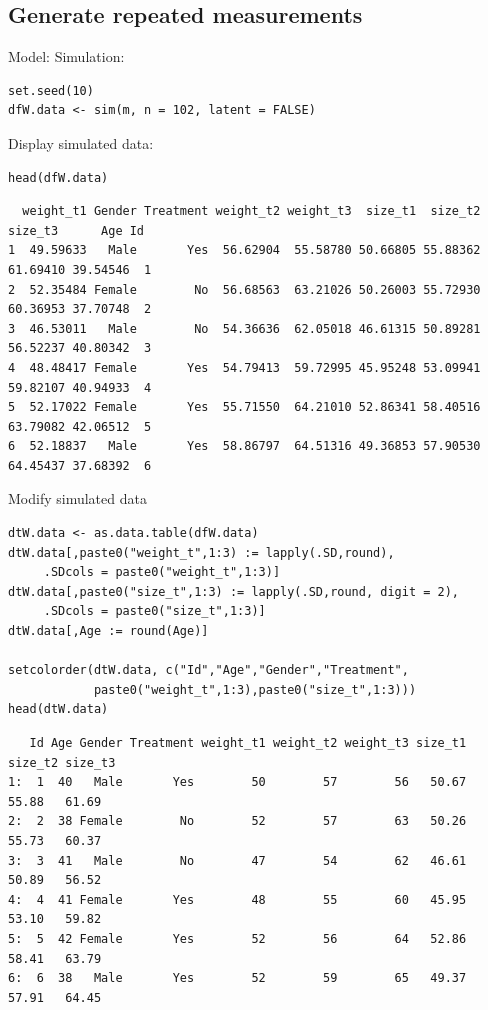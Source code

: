 \documentclass{article}
\begin{document}
\subsection{Generate repeated measurements}
\label{sec:orgcde3189}
Model:
Simulation:
\lstset{language=r,label= ,caption= ,captionpos=b,numbers=none}
\begin{lstlisting}
set.seed(10)
dfW.data <- sim(m, n = 102, latent = FALSE)
\end{lstlisting}

Display simulated data:
\lstset{language=r,label= ,caption= ,captionpos=b,numbers=none}
\begin{lstlisting}
head(dfW.data)
\end{lstlisting}

\begin{verbatim}
  weight_t1 Gender Treatment weight_t2 weight_t3  size_t1  size_t2  size_t3      Age Id
1  49.59633   Male       Yes  56.62904  55.58780 50.66805 55.88362 61.69410 39.54546  1
2  52.35484 Female        No  56.68563  63.21026 50.26003 55.72930 60.36953 37.70748  2
3  46.53011   Male        No  54.36636  62.05018 46.61315 50.89281 56.52237 40.80342  3
4  48.48417 Female       Yes  54.79413  59.72995 45.95248 53.09941 59.82107 40.94933  4
5  52.17022 Female       Yes  55.71550  64.21010 52.86341 58.40516 63.79082 42.06512  5
6  52.18837   Male       Yes  58.86797  64.51316 49.36853 57.90530 64.45437 37.68392  6
\end{verbatim}

Modify simulated data 
\lstset{language=r,label= ,caption= ,captionpos=b,numbers=none}
\begin{lstlisting}
dtW.data <- as.data.table(dfW.data)
dtW.data[,paste0("weight_t",1:3) := lapply(.SD,round),
	 .SDcols = paste0("weight_t",1:3)]
dtW.data[,paste0("size_t",1:3) := lapply(.SD,round, digit = 2),
	 .SDcols = paste0("size_t",1:3)]
dtW.data[,Age := round(Age)]

setcolorder(dtW.data, c("Id","Age","Gender","Treatment",
			paste0("weight_t",1:3),paste0("size_t",1:3)))
head(dtW.data)
\end{lstlisting}

\begin{verbatim}
   Id Age Gender Treatment weight_t1 weight_t2 weight_t3 size_t1 size_t2 size_t3
1:  1  40   Male       Yes        50        57        56   50.67   55.88   61.69
2:  2  38 Female        No        52        57        63   50.26   55.73   60.37
3:  3  41   Male        No        47        54        62   46.61   50.89   56.52
4:  4  41 Female       Yes        48        55        60   45.95   53.10   59.82
5:  5  42 Female       Yes        52        56        64   52.86   58.41   63.79
6:  6  38   Male       Yes        52        59        65   49.37   57.91   64.45
\end{verbatim}
\end{document}
